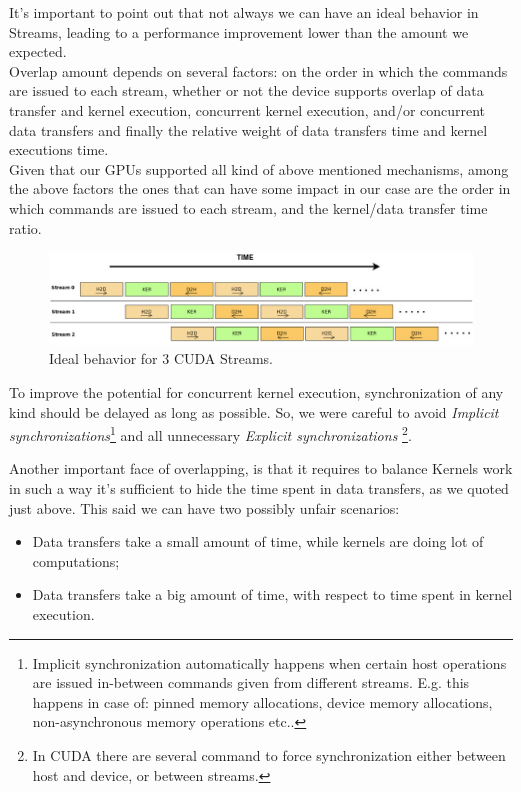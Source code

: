 	It's important to point out that not always we can have an ideal behavior in Streams, leading to a performance improvement lower than the amount we expected.\\
	Overlap amount depends on several factors: on the order in which the commands are issued to each stream, whether or not the device supports overlap of data transfer and kernel execution, concurrent kernel execution, and/or concurrent data transfers and finally the relative weight of data transfers time and kernel executions time\cite{cudabestpractices,cudaguide}.\\
	Given that our GPUs supported all kind of above mentioned mechanisms, among the above factors the  ones that can have some impact in our case are the order in which commands are issued to each stream, and the kernel/data transfer time ratio.\\
	\begin{figure}	
		\includegraphics[width=\linewidth]{images/3Streams.jpg}
		\caption{Ideal behavior for 3 CUDA Streams.}
		\label{fig:threeStreams}
	\end{figure}

	To improve the potential for concurrent kernel execution, synchronization of any kind should be delayed as long as possible\cite{cudabestpractices}.
	So, we were careful to avoid \textit{Implicit synchronizations}\footnote{Implicit synchronization automatically happens when certain host operations are issued in-between commands given from different streams. E.g. this happens in case of: pinned memory allocations, device memory allocations, non-asynchronous memory operations etc.\cite{cudastrandconcurr}.} and all unnecessary \textit{Explicit synchronizations} \footnote{In CUDA there are several command to force synchronization either between host and device, or between streams.}.
	
	Another important face of overlapping, is that it requires to balance Kernels work in such a way it's sufficient to hide the time spent in data transfers, as we quoted just above. 
	This said we can have two possibly unfair scenarios:
	\begin{itemize}
		\item Data transfers take a small amount of time, while kernels are doing lot of computations;
		
		\item Data transfers take a big amount of time, with respect to time spent in kernel execution.
	\end{itemize}
	
